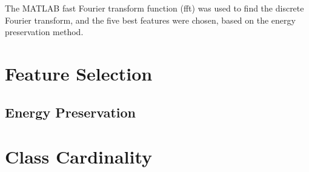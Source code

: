 The MATLAB fast Fourier transform function (fft) was used to find the discrete Fourier transform, and the five best features were chosen, based on the energy preservation method.


		
\section{Feature Selection}

\subsection{Energy Preservation}





\section{Class Cardinality}